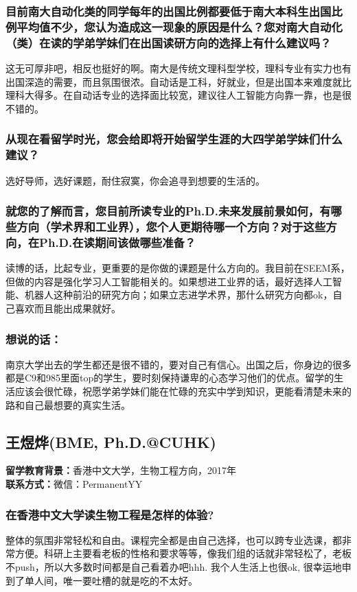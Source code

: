 \documentclass[a4paper,UTF8]{book}
\begin{document}
    \subsubsection*{目前南大自动化类的同学每年的出国比例都要低于南大本科生出国比例平均值不少，您认为造成这一现象的原因是什么？您对南大自动化（类）在读的学弟学妹们在出国读研方向的选择上有什么建议吗？}
    这无可厚非吧，相反也挺好的啊。南大是传统文理科型学校，理科专业有实力也有出国深造的需要，而且氛围很浓。自动话是工科，好就业，但是出国本来难度就比理科大得多。在自动话专业的选择面比较宽，建议往人工智能方向靠一靠，也是很不错的。
    
    \subsubsection*{从现在看留学时光，您会给即将开始留学生涯的大四学弟学妹们什么建议？}
    选好导师，选好课题，耐住寂寞，你会追寻到想要的生活的。

    \subsubsection*{就您的了解而言，您目前所读专业的Ph.D.未来发展前景如何，有哪些方向（学术界和工业界），您个人更期待哪一个方向？对于这些方向，在Ph.D.在读期间该做哪些准备？}
    读博的话，比起专业，更重要的是你做的课题是什么方向的。我目前在SEEM系，但做的内容是强化学习人工智能相关的。如果想进工业界的话，最好选择人工智能、机器人这种前沿的研究方向；如果立志进学术界，那什么研究方向都ok，自己喜欢而且能出成果就好。
                    
    \subsubsection{想说的话：}
    南京大学出去的学生都还是很不错的，要对自己有信心。出国之后，你身边的很多都是C9和985里面top的学生，要时刻保持谦卑的心态学习他们的优点。留学的生活应该会很忙碌，祝愿学弟学妹们能在忙碌的充实中学到知识，更能看清楚未来的路和自己最想要的真实生活。
        

    
\clearpage
\subsection{王煜烨(BME, Ph.D.@CUHK)}
    \textbf{留学教育背景：}香港中文大学，生物工程方向，2017年\\
    \textbf{联系方式：}微信：PermanentYY

    \subsubsection*{在香港中文大学读生物工程是怎样的体验?}
    整体的氛围非常轻松和自由。课程完全都是由自己选择，也可以跨专业选课，都非常方便。科研上主要看老板的性格和要求等等，像我们组的话就非常轻松了，老板不push，所以大多数时间都是自己看着办吧hhh. 我个人生活上也很ok, 很幸运地申到了单人间，唯一要吐槽的就是吃的不太好。
\end{document}
